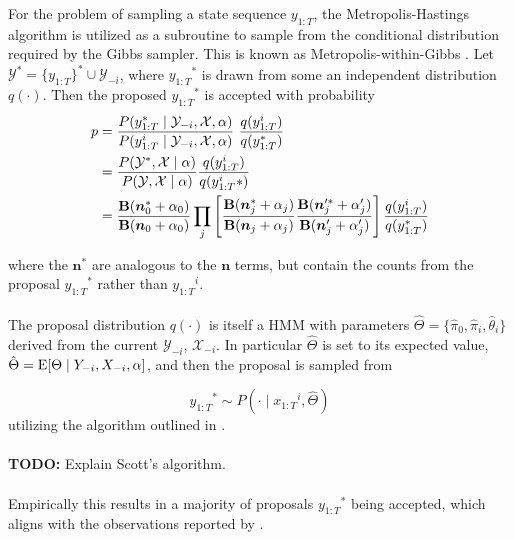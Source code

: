 \documentclass[12pt]{report}
\newcommand{\p}[0]{\prime}
\newcommand{\E}[0]{\text{\textnormal{E}}}
\newcommand{\1}[0]{\mathbbm{1}}
\newcommand{\Bf}[0]{\text{\textbf{B}}}
\newcommand{\seq}[3]{\ensuremath{#1_{{#2}:{#3}}}}
\begin{document}
For the problem of sampling a state sequence $\seq{y}{1}{T}$, the Metropolis-Hastings algorithm
is utilized as a subroutine to sample from the conditional distribution required
by the Gibbs sampler. This is known as Metropolis-within-Gibbs \cite{mh-within-gibbs}.
Let $\mathcal{Y}^* = \{\seq{y}{1}{T}\}^* \cup \mathcal{Y}_{-i}$,
where $\seq{y}{1}{T}^*$ is drawn from some an independent distribution $q(\cdot)$.
Then the proposed $\seq{y}{1}{T}^*$ is accepted with probability
\begin{align}
    p
    &= \frac{P(\seq{y}{1}{T}^* \mid \mathcal{Y}_{-i}, \mathcal{X}, \alpha)}
            {P(\seq{y}{1}{T}^i \mid \mathcal{Y}_{-i}, \mathcal{X}, \alpha)} \
            \frac{q(\seq{y}{1}{T}^i)}{q(\seq{y}{1}{T}^*)} \nonumber \\
    &= \frac{P(\mathcal{Y}^*, \mathcal{X} \mid \alpha)}
            {P(\mathcal{Y}, \mathcal{X} \mid \alpha)}
            \frac{q(\seq{y}{1}{T}^i)}{q(\seq{y}{1}{T}^i*)} \nonumber \\
    &= \frac{\Bf(\bm{n}_0^* + \alpha_0)}
            {\Bf(\bm{n}_0 + \alpha_0)}
    \prod_j \left[ \frac{\Bf(\bm{n}_j^* + \alpha_j)}
                        {\Bf(\bm{n}_j + \alpha_j)}
                   \frac{\Bf(\bm{n}_j^{\prime *} + \alpha_j^\p)}
                        {\Bf(\bm{n}_j^\p + \alpha_j^\p)}\right]
                   \frac{q(\seq{y}{1}{T}^i)}{q(\seq{y}{1}{T}^*)} \label{eq:mh-hmm-prob-accept}
\end{align}

where the $\bm{n}^*$ are analogous to the $\bm{n}$ terms, but contain the
counts from the proposal $\seq{y}{1}{T}^*$ rather than $\seq{y}{1}{T}^i$.
\\\\
The proposal distribution $q(\cdot)$ is itself a \ac{HMM} with parameters
$\hat{\Theta} = \{\hat{\pi}_0, \hat{\pi}_i, \hat{\theta}_i\}$ derived from the current
$\mathcal{Y}_{-i}$, $\mathcal{X}_{-i}$. In particular $\hat{\Theta}$ is set to its expected value,
$\hat{\Theta} = \E[\Theta \mid Y_{-i}, X_{-i}, \alpha]$, and then the proposal is sampled from

\[
    \seq{y}{1}{T}^* \sim P(\cdot \mid \seq{x}{1}{T}^i, \hat{\Theta})
\]
utilizing the algorithm outlined in \cite{scott-bayesian-hmm}.
\\\\
\textbf{TODO:} Explain Scott's algorithm.
\\\\
Empirically this results in a majority of proposals $\seq{y}{1}{T}^*$ being accepted, which aligns
with the observations reported by \cite{hmm-comparison-johnson}.
\end{document}
